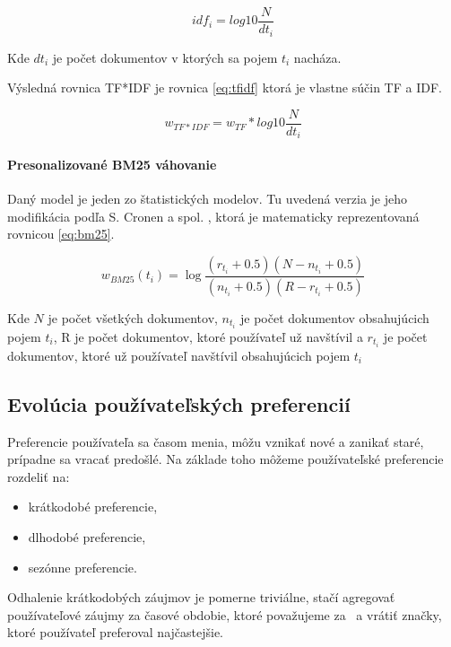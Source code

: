 \begin{equation} \label{eq:idf}
idf_i = log{10}\frac{N}{dt_i}
\end{equation}

Kde \(dt_i\) je počet dokumentov v ktorých sa pojem \(t_i\) nacháza.

Výsledná rovnica TF*IDF je rovnica \ref{eq:tfidf} ktorá je vlastne súčin TF a IDF.

\begin{equation} \label{eq:tfidf}
w_{TF*IDF} = w_{TF} * log{10}\frac{N}{dt_i}
\end{equation}


\paragraph{Presonalizované BM25 váhovanie}

Daný model je jeden zo štatistických modelov. Tu uvedená verzia je 
jeho modifikácia podľa S. Cronen a spol. \cite{modified_bm25}, ktorá
je matematicky reprezentovaná rovnicou \ref{eq:bm25}.

\begin{equation} \label{eq:bm25}
w_{BM25}(t_i) = \log{
    \frac{(r_{t_i} + 0.5)(N - n_{t_i} + 0.5)}
        {(n_{t_i} + 0.5)(R - r_{t_i} + 0.5)}}
\end{equation}

Kde \(N\) je počet všetkých dokumentov, \(n_{t_i}\) je počet
dokumentov obsahujúcich pojem \(t_i\), R je počet dokumentov,
ktoré používateľ už navštívil a \(r_{t_i}\) je počet dokumentov, ktoré
už používateľ navštívil obsahujúcich pojem \(t_i\)

\subsection{Evolúcia používateľských preferencií}

Preferencie používateľa sa časom menia, môžu vznikať nové a zanikať staré,
prípadne sa vracať predošlé. Na základe toho môžeme používateľské preferencie rozdeliť
na: 

\begin{itemize}
\item{krátkodobé preferencie,}
\item{dlhodobé preferencie,}
\item{sezónne preferencie.}
\end{itemize}

Odhalenie krátkodobých záujmov je pomerne triviálne, stačí agregovať používateľové záujmy
za časové obdobie, ktoré považujeme za  a vrátiť značky, ktoré používateľ 
preferoval najčastejšie.

